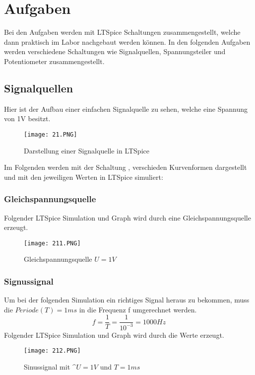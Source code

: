 \chapter{Aufgaben}
Bei den Aufgaben werden mit LTSpice Schaltungen zusammengestellt, welche dann praktisch im Labor nachgebaut werden können. In den folgenden Aufgaben werden verschiedene Schaltungen wie Signalquellen, Spannungsteiler und Potentiometer zusammengestellt. 

\section{Signalquellen}
Hier ist der Aufbau einer einfachen Signalquelle zu sehen, welche eine Spannung von 1V besitzt.
\begin{figure}[h!]
\centering
\texttt{[image: 21.PNG]}
\caption{Darstellung einer Signalquelle in LTSpice}
\label{fig: Signalquelle}
\end{figure}
\newpage
Im Folgenden werden mit der Schaltung , verschieden Kurvenformen dargestellt und mit den jeweiligen Werten in LTSpice simuliert:



\subsection{Gleichspannungsquelle}
Folgender LTSpice Simulation und Graph wird durch eine Gleichspannungsquelle erzeugt.
\begin{figure}[ht!]
\centering
\texttt{[image: 211.PNG]}
\caption{Gleichspannungsquelle $U=1V$}
\end{figure}

\subsection{Signussignal}
Um bei der folgenden Simulation ein richtiges Signal heraus zu bekommen, muss die $Periode(T)=1ms$ in die Frequenz f umgerechnet werden.
\begin{equation}
f=\frac{1}{T}=\frac{1}{10^{-3}}=1000Hz
\end{equation}
Folgender LTSpice Simulation und Graph wird durch die Werte erzeugt.
\begin{figure}[h!]
\centering
\texttt{[image: 212.PNG]}
\caption{Sinussignal mit $\^{U}=1V$ und $T=1ms$}
\label{fig: Sinussignal}
\end{figure}
\newpage

